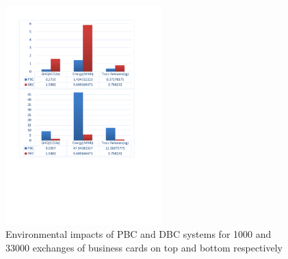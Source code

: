 \documentclass[conference]{IEEEtran}
\begin{document}

\begin{figure}[h]
\centering
\includegraphics[width=6cm]{EIO-LCA.pdf}
\caption{Environmental impacts of PBC and DBC systems for 1000 and 33000 exchanges of business cards on top and bottom respectively}
\label{screen1}
\end{figure}
\end{document}
